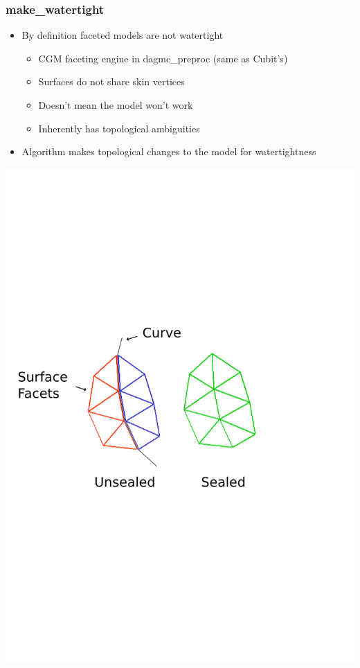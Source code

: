 \documentclass[14pt]{beamer}
\begin{document}
\begin{frame}
\frametitle{make\_watertight}

\begin{itemize}
\vfill
\item By definition faceted models are not watertight
	\begin{itemize}
	\item CGM faceting engine in dagmc\_preproc (same as Cubit's)
	\item Surfaces do not share skin vertices
	\item Doesn't mean the model won't work
	\item Inherently has topological ambiguities
	\end{itemize}
\vfill
\item Algorithm makes topological changes to the model for watertightness

\end{itemize}
\includegraphics[scale=0.45, trim = -100 0 0 300 ]{stitch00.png}

\end{frame}
\end{document}
